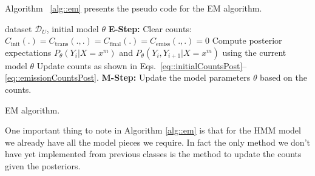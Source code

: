 %

Algorithm ~\ref{alg::em} presents the pseudo code for the EM
algorithm. 

\begin{algorithm}
\begin{algorithmic}[1]
   dataset $\mathcal{D}_{U}$, initial model $\theta$
    	  \STATE
    	  \STATE \textbf{E-Step:}
      \STATE Clear counts: $C_{\mathrm{init}}(.) = C_{\mathrm{trans}}(.,.) = C_{\mathrm{final}}(.) = C_{\mathrm{emiss}}(.,.) = 0$
      	\STATE Compute posterior expectations $P_{\theta}(Y_i|X=x^m)$ and $P_{\theta}(Y_i,Y_{i+1}|X=x^m)$ using the current model $\theta$
      \STATE Update counts as shown in Eqs.~\ref{eq::initialCountsPost}--\ref{eq::emissionCountsPost}.
      \ENDFOR
    	  \STATE
      \STATE \textbf{M-Step:}
         \STATE Update the model parameters $\theta$ based on the counts.
    \ENDFOR
\end{algorithmic}    
\caption[EM algorithm]{\label{alg::em}  EM algorithm.} 
\end{algorithm}


One important thing to note in Algorithm \ref{alg::em} is that for the
HMM model we already have all the model pieces we require. In fact
the only method we don't have yet implemented from previous classes is
the method to update the counts given the posteriors. 

